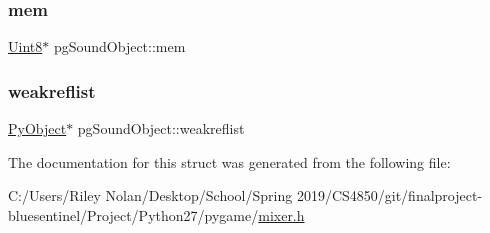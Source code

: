 \subsubsection{\texorpdfstring{mem}{mem}}
{\footnotesize\ttfamily \mbox{\hyperlink{_s_d_l__stdinc_8h_a2944638813a090aa23e62f4da842c3e2}{Uint8}}$\ast$ pg\+Sound\+Object\+::mem}

\mbox{\label{structpg_sound_object_a6a3af76d431e428d0132c6733b2d9057}} 
\subsubsection{\texorpdfstring{weakreflist}{weakreflist}}
{\footnotesize\ttfamily \mbox{\hyperlink{_python27_2object_8h_aadc84ac7aed2cfa6f20c25f62bf3dac7}{Py\+Object}}$\ast$ pg\+Sound\+Object\+::weakreflist}



The documentation for this struct was generated from the following file\+:\begin{DoxyCompactItemize}
\item 
C\+:/\+Users/\+Riley Nolan/\+Desktop/\+School/\+Spring 2019/\+C\+S4850/git/finalproject-\/bluesentinel/\+Project/\+Python27/pygame/\mbox{\hyperlink{mixer_8h}{mixer.\+h}}\end{DoxyCompactItemize}

